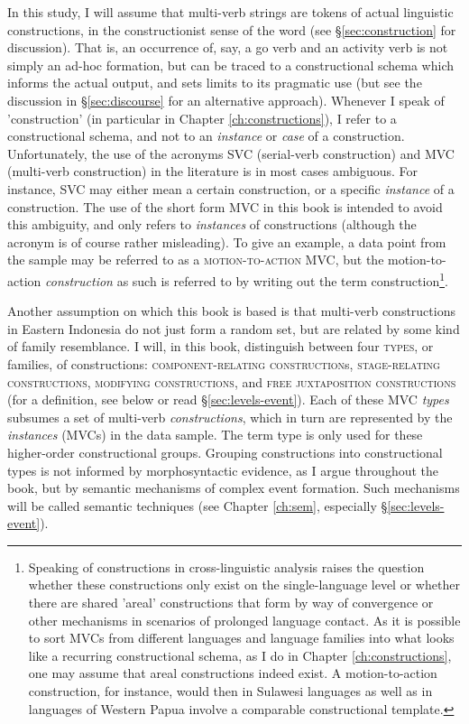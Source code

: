 In this study, I will assume that multi-verb strings are tokens of actual linguistic constructions, in the constructionist sense of the word (see §\ref{sec:construction} for discussion). That is, an occurrence of, say, a go verb and an activity verb is not simply an ad-hoc formation, but can be traced to a constructional schema which informs the actual output, and sets limits to its pragmatic use (but see the discussion in §\ref{sec:discourse} for an alternative approach). Whenever I speak of 'construction' (in particular in Chapter \ref{ch:constructions}), I refer to a constructional schema, and not to an \emph{instance} or \emph{case} of a construction. Unfortunately, the use of the acronyms SVC (serial-verb construction) and MVC (multi-verb construction) in the literature is in most cases ambiguous. For instance, SVC may either mean a certain construction, or a specific \emph{instance} of a construction. The use of the short form MVC in this book is intended to avoid this ambiguity, and only refers to \emph{instances} of constructions (although the acronym is of course rather misleading). To give an example, a data point from the sample may be referred to as a \textsc{motion-to-action} MVC, but the motion-to-action \emph{construction} as such is referred to by writing out the term construction\footnote{Speaking of constructions in cross-linguistic analysis raises the question whether these constructions only exist on the single-language level or whether there are shared 'areal' constructions that form by way of convergence or other mechanisms in scenarios of prolonged language contact. As it is possible to sort MVCs from different languages and language families into what looks like a recurring constructional schema, as I do in Chapter \ref{ch:constructions}, one may assume that areal constructions indeed exist. A motion-to-action construction, for instance, would then in Sulawesi languages as well as in languages of Western Papua involve a comparable constructional template.}. 

Another assumption on which this book is based is that multi-verb constructions in Eastern Indonesia do not just form a random set, but are related by some kind of family resemblance. I will, in this book, distinguish between four \textsc{types}, or families, of constructions: \textsc{component-relating construction}s, \textsc{stage-relating constructions}, \textsc{modifying constructions}, and \textsc{free juxtaposition constructions} (for a definition, see below or read §\ref{sec:levels-event}). Each of these MVC \emph{types} subsumes a set of multi-verb \emph{constructions}, which in turn are represented by the \emph{instances} (MVCs) in the data sample. The term type is only used for these higher-order constructional groups. Grouping constructions into constructional types is not informed by morphosyntactic evidence, as I argue throughout the book, but by semantic mechanisms of complex event formation. Such mechanisms will be called semantic techniques (see Chapter \ref{ch:sem}, especially §\ref{sec:levels-event}).

